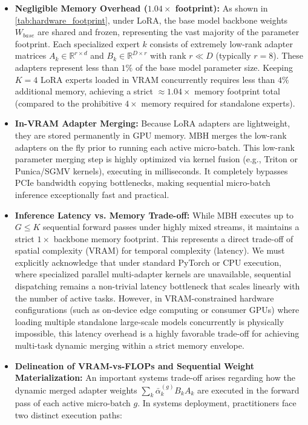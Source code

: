 \begin{itemize}
    \item \textbf{Negligible Memory Overhead ($1.04\times$ footprint):} As shown in \cref{tab:hardware_footprint}, under LoRA, the base model backbone weights $W_{base}$ are shared and frozen, representing the vast majority of the parameter footprint. Each specialized expert $k$ consists of extremely low-rank adapter matrices $A_k \in \mathbb{R}^{r \times d}$ and $B_k \in \mathbb{R}^{D \times r}$ with rank $r \ll D$ (typically $r=8$). These adapters represent less than $1\%$ of the base model parameter size. Keeping $K=4$ LoRA experts loaded in VRAM concurrently requires less than $4\%$ additional memory, achieving a strict $\approx 1.04\times$ memory footprint total (compared to the prohibitive $4\times$ memory required for standalone experts).
    \item \textbf{In-VRAM Adapter Merging:} Because LoRA adapters are lightweight, they are stored permanently in GPU memory. MBH merges the low-rank adapters on the fly prior to running each active micro-batch. This low-rank parameter merging step is highly optimized via kernel fusion (e.g., Triton or Punica/SGMV kernels), executing in milliseconds. It completely bypasses PCIe bandwidth copying bottlenecks, making sequential micro-batch inference exceptionally fast and practical.
    \item \textbf{Inference Latency vs. Memory Trade-off:} While MBH executes up to $G \le K$ sequential forward passes under highly mixed streams, it maintains a strict $1\times$ backbone memory footprint. This represents a direct trade-off of spatial complexity (VRAM) for temporal complexity (latency). We must explicitly acknowledge that under standard PyTorch or CPU execution, where specialized parallel multi-adapter kernels are unavailable, sequential dispatching remains a non-trivial latency bottleneck that scales linearly with the number of active tasks. However, in VRAM-constrained hardware configurations (such as on-device edge computing or consumer GPUs) where loading multiple standalone large-scale models concurrently is physically impossible, this latency overhead is a highly favorable trade-off for achieving multi-task dynamic merging within a strict memory envelope. 
    \item \textbf{Delineation of VRAM-vs-FLOPs and Sequential Weight Materialization:} 
    An important systems trade-off arises regarding how the dynamic merged adapter weights $\sum_k \bar{\alpha}_k^{(g)} B_k A_k$ are executed in the forward pass of each active micro-batch $g$. In systems deployment, practitioners face two distinct execution paths:

\end{itemize}
